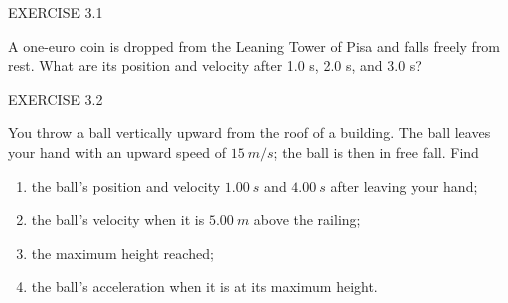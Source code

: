 \documentclass[]{beamer}
\begin{document}


\begin{frame}
    EXERCISE 3.1
    \pause
    
    \vspace{3mm}

    A one-euro coin is dropped from the Leaning Tower of Pisa and
    falls freely from rest. What are its position and velocity after 1.0 s,
    2.0 s, and 3.0 s?
     
    \end{frame}






\begin{frame}
    EXERCISE 3.2
  
    You throw a ball vertically upward from the roof of a building.
        The ball leaves your hand with
        an upward speed of $15~m/s$; the ball is then in free fall. Find 
        \pause
    \vspace{3mm}

    \begin{enumerate}
        \item the ball’s position and velocity $1.00~s$ and $4.00~s$ after leaving your hand;
        \pause
        \item the ball’s velocity when it is $5.00~m$ above the railing;
        \pause
        \item the maximum height reached;
        \pause
        \item the ball’s acceleration when it is at its maximum height.
    \end{enumerate}
    
    \end{frame}



\end{document}
